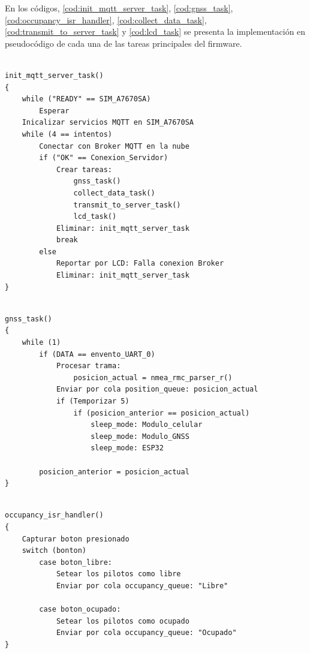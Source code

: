 En los códigos, \ref{cod:init_mqtt_server_task}, \ref{cod:gnss_task}, \ref{cod:occupancy_isr_handler}, \ref{cod:collect_data_task}, \ref{cod:transmit_to_server_task} y \ref{cod:lcd_task} se presenta la implementación en pseudocódigo de cada una de las tareas principales del firmware. 


\begin{lstlisting}[label=cod:init_mqtt_server_task, caption=Pseudocódigo de la función init\_mqtt\_server\_task().] 

init_mqtt_server_task()
{
	while ("READY" == SIM_A7670SA)
		Esperar
	Inicalizar servicios MQTT en SIM_A7670SA
	while (4 == intentos)
		Conectar con Broker MQTT en la nube
		if ("OK" == Conexion_Servidor)
			Crear tareas: 
				gnss_task()
				collect_data_task()
				transmit_to_server_task()
				lcd_task()
			Eliminar: init_mqtt_server_task
			break
		else
			Reportar por LCD: Falla conexion Broker
			Eliminar: init_mqtt_server_task
}

\end{lstlisting}

 


\begin{lstlisting}[label=cod:gnss_task, caption=Pseudocódigo de la función gnss\_task().] 

gnss_task()
{
	while (1)
		if (DATA == envento_UART_0)
			Procesar trama: 
				posicion_actual = nmea_rmc_parser_r()
			Enviar por cola position_queue: posicion_actual
			if (Temporizar 5)
				if (posicion_anterior == posicion_actual)
					sleep_mode: Modulo_celular
					sleep_mode: Modulo_GNSS
					sleep_mode: ESP32
					
		posicion_anterior = posicion_actual
}

\end{lstlisting}

 


\begin{lstlisting}[label=cod:occupancy_isr_handler, caption=Pseudocódigo de la función occupancy\_isr\_handler().] 

occupancy_isr_handler()
{
	Capturar boton presionado
	switch (bonton)
		case boton_libre: 
			Setear los pilotos como libre
			Enviar por cola occupancy_queue: "Libre"
		
		case boton_ocupado:
			Setear los pilotos como ocupado
			Enviar por cola occupancy_queue: "Ocupado"	
}

\end{lstlisting}

 

